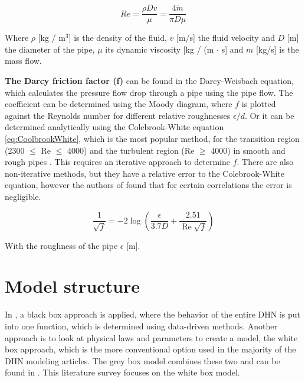 \begin{equation}\label{eq::Re}
R e=\frac{\rho D v}{\mu}=\frac{4 \dot{m}}{\pi D \mu}
\end{equation}

Where $\rho$ [kg / m$^3$] is the density of the fluid, $v$ [m/s] the fluid velocity and $D$ [m] the diameter of the pipe, $\mu$ its dynamic viscosity [kg / (m $\cdot$ s] and $\dot{m}$ [kg/s] is the mass flow. 

\textbf{The Darcy friction factor (f)} can be found in the Darcy-Weisbach equation, which calculates the pressure flow drop through a pipe using the pipe flow. The coefficient can be determined using the Moody diagram, where $f$ is plotted against the Reynolds number for different relative roughnesses $\epsilon / d$. Or it can be determined analytically using the Colebrook-White equation \ref{eq:CoolbrookWhite}, which is the most popular method, for the transition region (2300 $\leq$ Re $\leq$ 4000) and the turbulent region (Re $\geq$ 4000) in smooth and rough pipes \cite{Darcyfrictionfactor}. This requires an iterative approach to determine $f$. There are also non-iterative methods, but they have a relative error to the Colebrook-White equation, however the authors of \cite{Darcyfrictionfactor} found that for certain correlations the error is negligible.

\begin{equation}\label{eq:CoolbrookWhite}
\frac{1}{\sqrt{f}}=-2 \log \left(\frac{\epsilon}{3.7 D}+\frac{2.51}{\operatorname{Re} \sqrt{f}}\right)
\end{equation}

With the roughness of the pipe $\epsilon$ [m].

\section{Model structure}
In \cite{GUELPA2016586}\cite{KECEBAS2012339}, a black box approach is applied, where the behavior of the entire DHN is put into one function, which is determined using data-driven methods. Another approach is to look at physical laws and parameters to create a model, the white box approach, which is the more conventional option used in the majority of the DHN modeling articles. The grey box model combines these two and can be found in \cite{grey1}\cite{grey2}. This literature survey focuses on the white box model.

